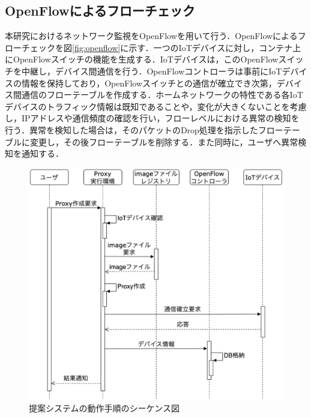 \documentclass[a4paper,10pt,twocolumn,uplatex]{jsarticle}
\begin{document}
\subsection{OpenFlowによるフローチェック}
本研究におけるネットワーク監視をOpenFlowを用いて行う．OpenFlowによるフローチェックを図\ref{fig:openflow}に示す．一つのIoTデバイスに対し，コンテナ上にOpenFlowスイッチの機能を生成する．IoTデバイスは，このOpenFlowスイッチを中継し，デバイス間通信を行う．OpenFlowコントローラは事前にIoTデバイスの情報を保持しており，OpenFlowスイッチとの通信が確立でき次第，デバイス間通信のフローテーブルを作成する．ホームネットワークの特性である各IoTデバイスのトラフィック情報は既知であることや，変化が大きくないことを考慮し，IPアドレスや通信頻度の確認を行い，フローレベルにおける異常の検知を行う．異常を検知した場合は，そのパケットのDrop処理を指示したフローテーブルに変更し，その後フローテーブルを削除する．また同時に，ユーザへ異常検知を通知する．

\begin{figure}[!tb]
  \centering
  \includegraphics[width=\linewidth]{img/seaquence.eps}
  \caption{提案システムの動作手順のシーケンス図}
  \label{fig:seaquence}
\end{figure}
\end{document}
